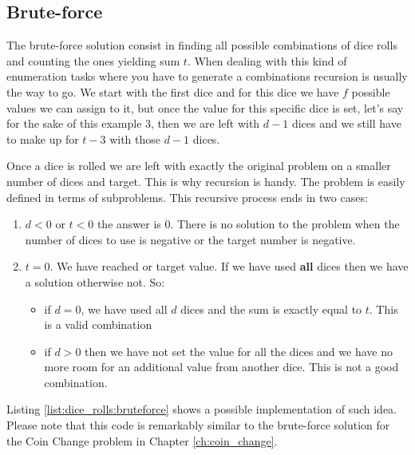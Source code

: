 \subsection{Brute-force}
\label{dice_rolls:sec:bruteforce}
The brute-force solution consist in finding all possible combinations of dice rolls and counting the ones yielding sum $t$. 
When dealing with this kind of enumeration tasks where you have to generate a combinations recursion is usually the way to go. 
We start with the first dice and for this dice we have $f$ possible values we can assign to it, 
but once the value for this specific dice is set, let's say for the sake of this example $3$,
then we are left with $d-1$ dices and we still have to make up for $t-3$  with those $d-1$ dices.

Once a dice is rolled we are left with exactly the original problem on a smaller number of dices and target.
This is why recursion is handy. The problem is easily defined in terms of subproblems.
This recursive process ends in two cases:
\begin{enumerate}
	\item $d<0$ or $t<0$ the answer is $0$. There is no solution to the problem when the number of dices to use is negative or the target number is negative.
	\item $t=0$. We have reached or target value. If we have used \textbf{all} dices then we have a solution otherwise not. So:
	\begin{itemize}
		\item if $d=0$, we have used all $d$ dices and the sum is exactly equal to $t$. This is a valid combination
		\item if $d>0$ then we have not set the value for all the dices and we have no more room for an additional value from another dice. This is not a good combination.
	\end{itemize}
\end{enumerate}


Listing \ref{list:dice_rolls:bruteforce} shows a possible implementation of such idea. Please note that this code is remarkably similar to the brute-force solution  for the Coin Change problem in Chapter \ref{ch:coin_change}.



